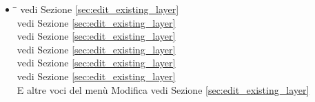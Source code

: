 \begin{itemize}
\item {}
\begin{tabbing}
\hspace{4.5cm}\=\hspace{3cm}\=\hspace{3.5cm}\= \kill
{} 
	\> 
	\> vedi Sezione \ref{sec:edit_existing_layer} 
	\>  \\
	\> 
	\> vedi Sezione \ref{sec:edit_existing_layer} 
	\>  \\
	\> 
	\> vedi Sezione \ref{sec:edit_existing_layer} 
	\>  \\
	\> 
	\> vedi Sezione \ref{sec:edit_existing_layer} 
	\>  \\
	\> \keystroke{/}
	\> vedi Sezione \ref{sec:edit_existing_layer} 
	\>  \\
	\> 
	\> vedi Sezione \ref{sec:edit_existing_layer} 
	\>  \\
E altre voci del menù Modifica
	\>
	\> vedi Sezione \ref{sec:edit_existing_layer} 
	\>  \\
\end{tabbing}



\end{itemize}
